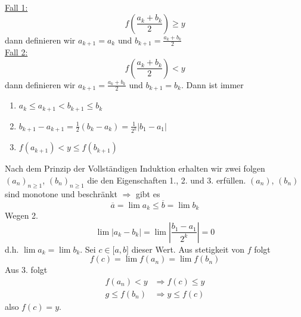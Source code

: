 \begin{beweis}{}
\noindent\underline{Fall 1:}
\[f\left( {\frac{{{a_k} + {b_k}}}{2}} \right) \ge y\] dann definieren wir $a_{k+1}=a_k$ und $b_{k+1}=\frac{a_k+b_k}{2}$\\

\noindent\underline{Fall 2:}
\[f\left( {\frac{{{a_k} + {b_k}}}{2}} \right) < y\]
dann definieren wir $a_{k+1}=\frac{a_k+b_k}{2}$ und $b_{k+1}=b_k$. Dann ist immer
\begin{enumerate}
\item $a_k\leq a_{k+1}<b_{k+1}\leq b_k$
\item ${b_{k + 1}} - {a_{k + 1}} = \frac{1}{2}\left( {{b_k} - {a_k}} \right) = \frac{1}{{{2^k}}}\left| {{b_1} - {a_1}} \right|$
\item $f\left( a_{k+1}\right) < y \leq f\left( b_{k+1}\right)$
\end{enumerate}
Nach dem Prinzip der Vollständigen Induktion erhalten wir zwei folgen $\left( a_n\right)_{n\geq 1}$, $\left( b_n\right)_{n\geq 1}$ die den Eigenschaften 1., 2. und 3. erfüllen. $\left( a_n\right)$, $\left( b_n\right)$ sind monotone und beschränkt $\Rightarrow$ gibt es 
\[\overline{a}=\lim a_k\leq\overline{b}=\lim b_k \]
Wegen 2.
\[\lim \left| {{a_k} - {b_k}} \right| = \lim \left| {\frac{{{b_1} - {a_1}}}{{{2^k}}}} \right| = 0\]
d.h. $\lim a_k=\lim b_k$. Sei $c\in\lbrack a,b\rbrack$ dieser Wert. Aus stetigkeit von $f$ folgt 
\[f\left( c \right) = \lim f\left( {{a_n}} \right) = \lim f\left( {{b_n}} \right)\]
Aus 3. folgt 
\begin{align*}
f\left( {{a_n}} \right) < y &\Rightarrow f\left( c \right) \le y\\
g \le f\left( {{b_n}} \right) &\Rightarrow y \le f\left( c \right)
\end{align*}
also $f(c)=y$.
\end{beweis}

